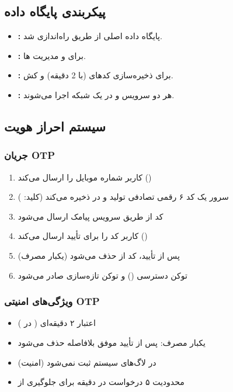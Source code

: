 \documentclass[12pt, a4paper]{article}
\begin{document}
\subsection{پیکربندی پایگاه داده}

\begin{itemize}[rightmargin=0.5cm]
  \item \textbf{:} پایگاه داده اصلی از طریق  راه‌اندازی شد.
  \item \textbf{:} برای  و مدیریت ها.
  \item \textbf{:} برای ذخیره‌سازی کدهای  (با  2 دقیقه) و کش.
  \item \textbf{:} هر دو سرویس  و  در یک شبکه
     اجرا می‌شوند.
\end{itemize}

\subsection{سیستم احراز هویت}

\subsubsection{جریان OTP}
\begin{enumerate}[rightmargin=0.5cm]
  \item کاربر شماره موبایل را ارسال می‌کند ()
  \item سرور یک کد ۶ رقمی تصادفی تولید و در  ذخیره می‌کند (کلید: )
  \item کد از طریق سرویس پیامک ارسال می‌شود
  \item کاربر کد را برای تأیید ارسال می‌کند ()
  \item پس از تأیید، کد از  حذف می‌شود (یکبار مصرف)
  \item توکن دسترسی () و توکن تازه‌سازی صادر می‌شود
\end{enumerate}

\subsubsection{ویژگی‌های امنیتی OTP}
\begin{itemize}[rightmargin=0.5cm]
  \item اعتبار ۲ دقیقه‌ای ( در )
  \item یکبار مصرف: پس از تأیید موفق بلافاصله حذف می‌شود
  \item {} در لاگ‌های سیستم ثبت نمی‌شود (امنیت)
  \item محدودیت ۵ درخواست در دقیقه برای جلوگیری از 
\end{itemize}
\end{document}
